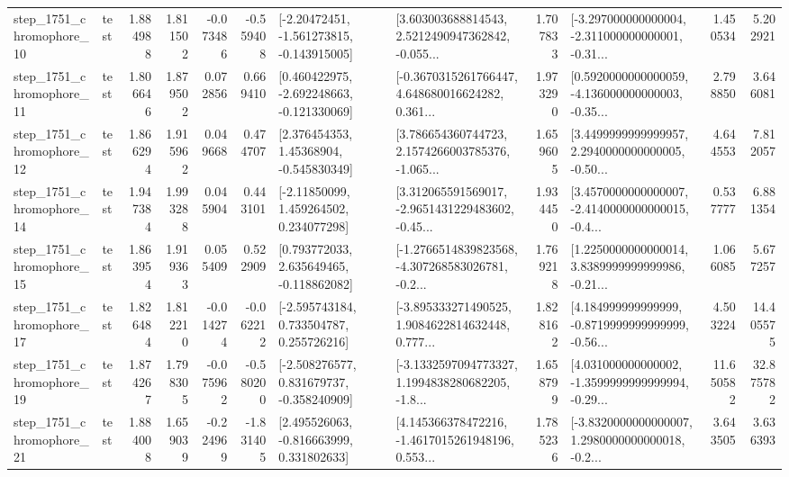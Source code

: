 \begin{tabular}{llrrrrllrlrr}
 step\_1751\_chromophore\_10 &      test &      1.884988 &    1.811502 &     -0.073486 & -0.559408 &   [-2.20472451, -1.561273815, -0.143915005] &  [3.603003688814543, 2.5212490947362842, -0.055... &       1.707833 &  [-3.297000000000004, -2.311000000000001, -0.31... &            1.450534 &          5.202921 \\
 step\_1751\_chromophore\_11 &      test &      1.806646 &    1.879502 &      0.072856 &  0.669410 &   [0.460422975, -2.692248663, -0.121330069] &  [-0.3670315261766447, 4.648680016624282, 0.361... &       1.973290 &  [0.5920000000000059, -4.136000000000003, -0.35... &            2.798850 &          3.646081 \\
 step\_1751\_chromophore\_12 &      test &      1.866294 &    1.915962 &      0.049668 &  0.474707 &     [2.376454353, 1.45368904, -0.545830349] &  [3.786654360744723, 2.1574266003785376, -1.065... &       1.659605 &  [3.4499999999999957, 2.2940000000000005, -0.50... &            4.644553 &          7.812057 \\
 step\_1751\_chromophore\_14 &      test &      1.947384 &    1.993288 &      0.045904 &  0.443101 &     [-2.11850099, 1.459264502, 0.234077298] &  [3.312065591569017, -2.9651431229483602, -0.45... &       1.934450 &  [3.4570000000000007, -2.4140000000000015, -0.4... &            0.537777 &          6.881354 \\
 step\_1751\_chromophore\_15 &      test &      1.863954 &    1.919363 &      0.055409 &  0.522909 &    [0.793772033, 2.635649465, -0.118862082] &  [-1.2766514839823568, -4.307268583026781, -0.2... &       1.769218 &  [1.2250000000000014, 3.8389999999999986, -0.21... &            1.066085 &          5.677257 \\
 step\_1751\_chromophore\_17 &      test &      1.826484 &    1.812210 &     -0.014274 & -0.062212 &    [-2.595743184, 0.733504787, 0.255726216] &  [-3.895333271490525, 1.9084622814632448, 0.777... &       1.828162 &  [4.184999999999999, -0.8719999999999999, -0.56... &            4.503224 &         14.405575 \\
 step\_1751\_chromophore\_19 &      test &      1.874267 &    1.798305 &     -0.075962 & -0.580200 &   [-2.508276577, 0.831679737, -0.358240909] &  [-3.1332597094773327, 1.1994838280682205, -1.8... &       1.658799 &  [4.031000000000002, -1.3599999999999994, -0.29... &           11.650582 &         32.875782 \\
 step\_1751\_chromophore\_21 &      test &      1.884008 &    1.659039 &     -0.224969 & -1.831405 &    [2.495526063, -0.816663999, 0.331802633] &  [4.145366378472216, -1.4617015261948196, 0.553... &       1.785236 &  [-3.8320000000000007, 1.2980000000000018, -0.2... &            3.643505 &          3.636393 \\

\end{tabular}
